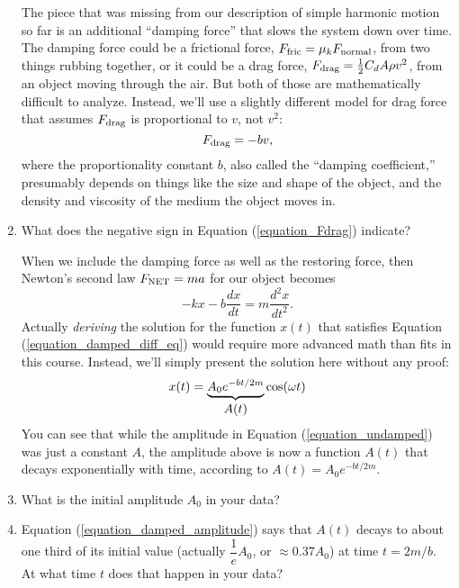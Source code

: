 \begin{enumerate}[labparts]
The piece that was missing from our description of simple harmonic motion so far is an additional ``damping force'' that slows the system down over time.  The damping force could be a frictional force, $F_{\rm fric}=\mu_k F_{\rm normal}$,  from two things rubbing together, or it could be a drag force, $F_{\rm drag} = \frac{1}{2}C_d A \rho v^2$, from an object moving through the air.  
But both of those are mathematically difficult to analyze.  Instead, we'll use a slightly different model for drag force that assumes $F_{\rm drag}$ is proportional to $v$, not $v^2$:
\begin{equation}
F_{\rm drag}=-bv,
\label{equation_Fdrag}
\end{equation}
where the proportionality constant $b$, also called the ``damping coefficient,'' presumably depends on things like the size and shape of the object, and the density and viscosity of the medium the object moves in.

\item What does the negative sign in Equation (\ref{equation_Fdrag}) indicate?
\answerspace{0.6in}

When we include the damping force as well as the restoring force, then Newton's second law $F_{\rm NET} = ma$ for our object becomes
\begin{equation}
-kx-b\frac{dx}{dt}=m\frac{d^2x}{dt^2}.
\label{equation_damped_diff_eq}
\end{equation}
Actually \textit{deriving} the solution for the function $x(t)$ that satisfies Equation (\ref{equation_damped_diff_eq}) would require more advanced math than fits in this course.  Instead, we'll simply present the solution here without any proof:  
\begin{equation}
x(t)=\underbrace{A_0e^{-bt/2m}}_{%
\let\scriptstyle\textstyle 
\substack{A(t)}}
\cos(\omega t)
\label{equation_damped_amplitude}
\end{equation}
You can see that while the amplitude in Equation (\ref{equation_undamped}) was just a constant $A$, the amplitude above is now a function 
$A(t)$ that decays exponentially with time, according to $A(t) = A_0e^{-bt/2m}$.   

\item What is the initial amplitude $A_0$ in your data?
\answerspace{0.6in}

\item Equation (\ref{equation_damped_amplitude}) says that $A(t)$ decays to about one third of its initial value (actually $\dfrac{1}{e}A_0$, or $\approx 0.37A_0$) at time $t=2m/b$.  At what time $t$ does that happen in your data?
\answerspace{0.6in}


\end{enumerate}
